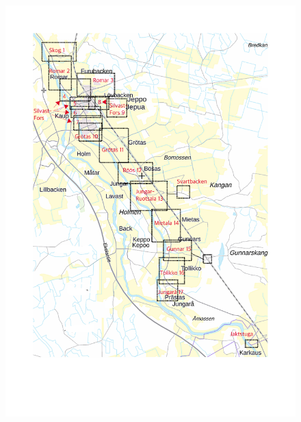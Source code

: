 

\begin{figure}[p]
  \centering
  \includegraphics[width=1\textwidth]{kartor/Kartregister.pdf}
  \label{map:registry}
\end{figure}

